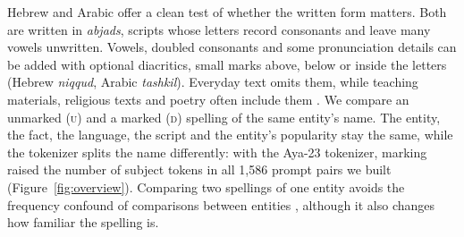 \documentclass[11pt]{article}
\newcommand{\U}{\textsc{u}}
\newcommand{\D}{\textsc{d}}
\begin{document}
Hebrew and Arabic offer a clean test of whether the written form matters. Both
are written in \emph{abjads}, scripts whose letters record consonants and leave
many vowels unwritten. Vowels, doubled consonants and some pronunciation details
can be added with optional diacritics, small marks above, below or inside
the letters (Hebrew \emph{niqqud}, Arabic \emph{tashkil}). Everyday text omits
them, while teaching materials, religious texts and poetry often include them
\citep{habash-2010-introduction,gershuni-pinter-2022-restoring}. We compare an
unmarked (\U) and a marked (\D) spelling of the same entity's name. The entity,
the fact, the language, the script and the entity's popularity stay the same,
while the tokenizer splits the name differently: with the Aya-23 tokenizer,
marking raised the number of subject tokens in all 1{,}586 prompt pairs we built
(Figure~\ref{fig:overview}). Comparing two spellings of one entity avoids the
frequency confound of comparisons between entities
\citep{kandpal-etal-2023-longtail,mallen-etal-2023-trust}, although it also
changes how familiar the spelling is.
\end{document}
